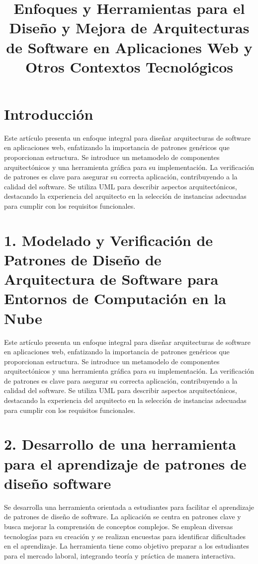 \documentclass[twocolumn]{article}
\title{Enfoques y Herramientas para el Diseño y Mejora de Arquitecturas de Software en Aplicaciones Web y Otros Contextos Tecnológicos}
\author{}
\date{}
\begin{document}
\maketitle
\section{Introducción}
Este artículo presenta un enfoque integral para diseñar arquitecturas de software en aplicaciones web, enfatizando la importancia de patrones genéricos que proporcionan estructura. Se introduce un metamodelo de componentes arquitectónicos y una herramienta gráfica para su implementación. La verificación de patrones es clave para asegurar su correcta aplicación, contribuyendo a la calidad del software. Se utiliza UML para describir aspectos arquitectónicos, destacando la experiencia del arquitecto en la selección de instancias adecuadas para cumplir con los requisitos funcionales.

\section*{1. Modelado y Verificación de Patrones de Diseño de Arquitectura de Software para Entornos de Computación en la Nube}
Este artículo presenta un enfoque integral para diseñar arquitecturas de software en aplicaciones web, enfatizando la importancia de patrones genéricos que proporcionan estructura. Se introduce un metamodelo de componentes arquitectónicos y una herramienta gráfica para su implementación. La verificación de patrones es clave para asegurar su correcta aplicación, contribuyendo a la calidad del software. Se utiliza UML para describir aspectos arquitectónicos, destacando la experiencia del arquitecto en la selección de instancias adecuadas para cumplir con los requisitos funcionales.


\printbibliography[heading=subbibliography]

\section*{2. Desarrollo de una herramienta para el aprendizaje de patrones de diseño software}
Se desarrolla una herramienta orientada a estudiantes para facilitar el aprendizaje de patrones de diseño de software. La aplicación se centra en patrones clave y busca mejorar la comprensión de conceptos complejos. Se emplean diversas tecnologías para su creación y se realizan encuestas para identificar dificultades en el aprendizaje. La herramienta tiene como objetivo preparar a los estudiantes para el mercado laboral, integrando teoría y práctica de manera interactiva.
\end{document}
